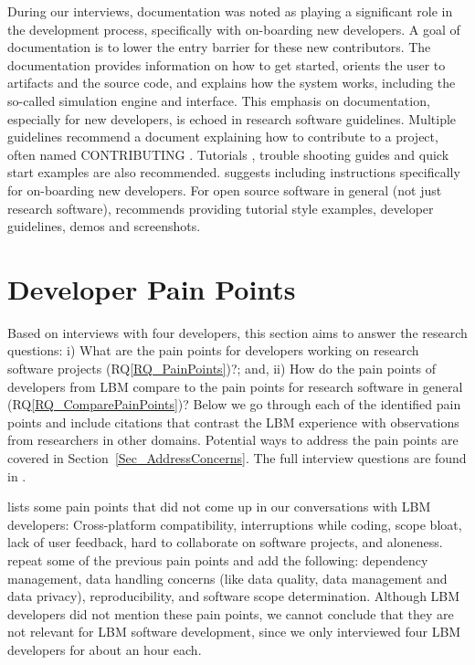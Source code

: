 \documentclass[final, 3p, times, authoryear]{elsarticle}
\newcommand{\rqref}[1]{RQ\ref{#1}}
\begin{document}
During our interviews, documentation was noted as playing a significant role in
the development process, specifically with on-boarding new developers. A goal of
documentation is to lower the entry barrier for these new contributors. The
documentation provides information on how to get started, orients the user to
artifacts and the source code, and explains how the system works, including the
so-called simulation engine and interface.  This emphasis on documentation,
especially for new developers, is echoed in research software guidelines.
Multiple guidelines recommend a document explaining how to contribute to a
project, often named CONTRIBUTING \citep{Yo2021, BrettEtAl2021, WilsonEtAl2016,
ThielEtAl2020, vanGompelEtAl2016, OrvizEtAl2017, FLOSS2022, JimenezEtAl2017}.
Tutorials \citep{ThielEtAl2020}, trouble shooting guides \citep{OrvizEtAl2017,
SSI2022} and quick start examples \citep{ThielEtAl2020, vanGompelEtAl2016} are
also recommended.  \citet{SmithAndRoscoe2018} suggests including instructions
specifically for on-boarding new developers. For open source software in general
(not just research software), \citet{Fogel2005} recommends providing tutorial
style examples, developer guidelines, demos and screenshots.

\section{Developer Pain Points} \label{painpoints}

Based on interviews with four developers, this section aims to answer the
research questions: i) What are the pain points for developers working on
research software projects (\rqref{RQ_PainPoints})?; and, ii) How do the pain
points of developers from LBM compare to the pain points for research software
in general (\rqref{RQ_ComparePainPoints})?  Below we go through each of the
identified pain points and include citations that contrast the LBM experience
with observations from researchers in other domains.  Potential ways to address
the pain points are covered in Section~\ref{Sec_AddressConcerns}. The full
interview questions are found in \citet{SmithEtAl2021}.

\citet{PintoEtAl2018} lists some pain points that did not come up in our
conversations with LBM developers: Cross-platform compatibility, interruptions
while coding, scope bloat, lack of user feedback, hard to collaborate on
software projects, and aloneness. \citet{WieseEtAl2019} repeat some of the
previous pain points and add the following: dependency management, data handling
concerns (like data quality, data management and data privacy), reproducibility,
and software scope determination. Although LBM developers did not mention these
pain points, we cannot conclude that they are not relevant for LBM software
development, since we only interviewed four LBM developers for about an hour each.
\end{document}
